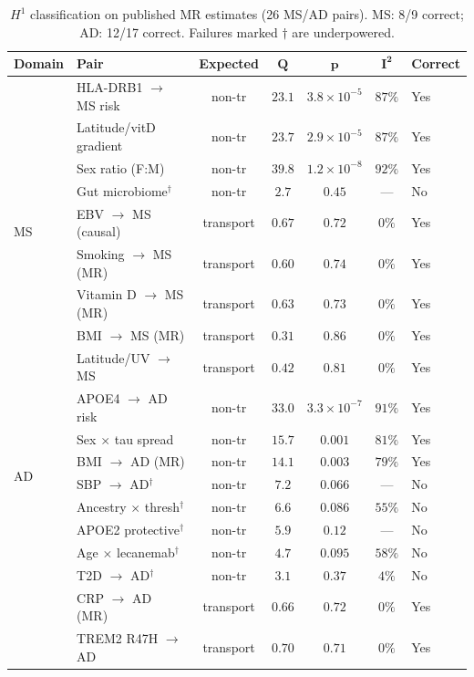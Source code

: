 \documentclass{article}
\begin{document}
\begin{table}[t]
\centering
\caption{$H^1$ classification on published MR estimates (26 MS/AD pairs). MS: 8/9 correct; AD: 12/17 correct. Failures marked $\dagger$ are underpowered.}
\label{tab:realdata-h1}
\small
\begin{tabular}{@{}llccccl@{}}
\toprule
\textbf{Domain} & \textbf{Pair} & \textbf{Expected} & $\boldsymbol{Q}$ & $\boldsymbol{p}$ & $\boldsymbol{I^2}$ & \textbf{Correct} \\
\midrule
\multirow{9}{*}{MS}
& HLA-DRB1 $\to$ MS risk & non-tr & $23.1$ & $3.8 \times 10^{-5}$ & $87\%$ & Yes \\
& Latitude/vitD gradient & non-tr & $23.7$ & $2.9 \times 10^{-5}$ & $87\%$ & Yes \\
& Sex ratio (F:M) & non-tr & $39.8$ & $1.2 \times 10^{-8}$ & $92\%$ & Yes \\
& Gut microbiome$^\dagger$ & non-tr & $2.7$ & $0.45$ & --- & No \\
& EBV $\to$ MS (causal) & transport & $0.67$ & $0.72$ & $0\%$ & Yes \\
& Smoking $\to$ MS (MR) & transport & $0.60$ & $0.74$ & $0\%$ & Yes \\
& Vitamin D $\to$ MS (MR) & transport & $0.63$ & $0.73$ & $0\%$ & Yes \\
& BMI $\to$ MS (MR) & transport & $0.31$ & $0.86$ & $0\%$ & Yes \\
& Latitude/UV $\to$ MS & transport & $0.42$ & $0.81$ & $0\%$ & Yes \\
\midrule
\multirow{7}{*}{AD}
& APOE4 $\to$ AD risk & non-tr & $33.0$ & $3.3 \times 10^{-7}$ & $91\%$ & Yes \\
& Sex $\times$ tau spread & non-tr & $15.7$ & $0.001$ & $81\%$ & Yes \\
& BMI $\to$ AD (MR) & non-tr & $14.1$ & $0.003$ & $79\%$ & Yes \\
& SBP $\to$ AD$^\dagger$ & non-tr & $7.2$ & $0.066$ & --- & No \\
& Ancestry $\times$ thresh$^\dagger$ & non-tr & $6.6$ & $0.086$ & $55\%$ & No \\
& APOE2 protective$^\dagger$ & non-tr & $5.9$ & $0.12$ & --- & No \\
& Age $\times$ lecanemab$^\dagger$ & non-tr & $4.7$ & $0.095$ & $58\%$ & No \\
& T2D $\to$ AD$^\dagger$ & non-tr & $3.1$ & $0.37$ & $4\%$ & No \\
& CRP $\to$ AD (MR) & transport & $0.66$ & $0.72$ & $0\%$ & Yes \\
& TREM2 R47H $\to$ AD & transport & $0.70$ & $0.71$ & $0\%$ & Yes \\

\end{tabular}
\end{table}
\end{document}
